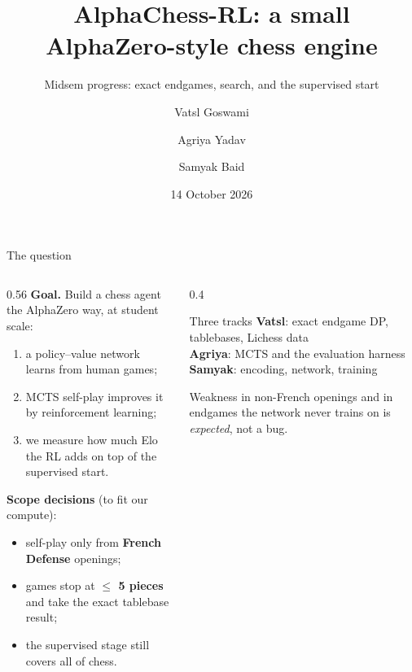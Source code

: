 \documentclass[aspectratio=169, 10pt]{beamer}
\title{AlphaChess-RL: a small AlphaZero-style chess engine}
\subtitle{Midsem progress: exact endgames, search, and the supervised start}
\author{Vatsl Goswami \and Agriya Yadav \and Samyak Baid}
\institute{Reinforcement Learning course project · Ashoka University · Monsoon 2026}
\date{14 October 2026}
\newcommand{\track}[2]{{\color{#1}\textbf{#2}}}
\begin{document}
\maketitle

\begin{frame}{The question}
  \small
  \begin{columns}[T]
    \begin{column}{0.56\textwidth}
      \textbf{Goal.} Build a chess agent the AlphaZero way, at student scale:
      \begin{enumerate}
        \item a \alert{policy--value network} learns from human games;
        \item \alert{MCTS self-play} improves it by reinforcement learning;
        \item we \alert{measure how much Elo the RL adds} on top of the supervised start.
      \end{enumerate}
      \medskip
      \textbf{Scope decisions} (to fit our compute):
      \begin{itemize}
        \item self-play only from \textbf{French Defense} openings;
        \item games stop at \textbf{$\le$ 5 pieces} and take the exact tablebase result;
        \item the supervised stage still covers all of chess.
      \end{itemize}
    \end{column}
    \begin{column}{0.4\textwidth}
      \begin{block}{Three tracks}
        \track{acDP}{Vatsl}: exact endgame DP, tablebases, Lichess data\\[3pt]
        \track{acSearch}{Agriya}: MCTS and the evaluation harness\\[3pt]
        \track{acNet}{Samyak}: encoding, network, training
      \end{block}
      \medskip
      {\small Weakness in non-French openings and in endgames the network never trains on is
      \emph{expected}, not a bug.}
    \end{column}
  \end{columns}
\end{frame}
\end{document}
